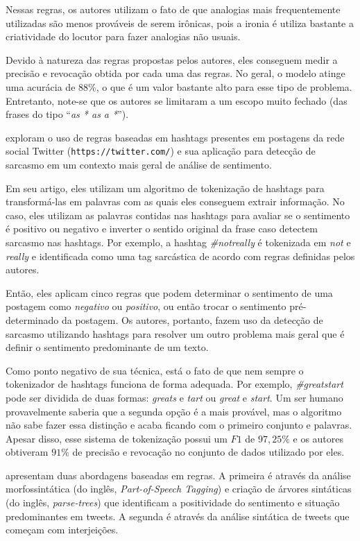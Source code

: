 Nessas regras, os autores utilizam o fato de que analogias mais frequentemente
utilizadas são menos prováveis de serem irônicas, pois a ironia é utiliza
bastante a criatividade do locutor para fazer analogias não usuais.

Devido à natureza das regras propostas pelos autores, eles conseguem medir a
precisão e revocação obtida por cada uma das regras. No geral, o modelo atinge
uma acurácia de $88\%$, o que é um valor bastante alto para esse tipo de
problema. Entretanto, note-se que os autores se limitaram a um escopo muito
fechado (das frases do tipo ``\textit{as * as a *}'').

\cite{maynard-greenwood:2014:cares} exploram o uso de regras baseadas em
hashtags presentes em postagens da rede social Twitter
(\texttt{https://twitter.com/}) e sua aplicação para detecção de sarcasmo em um
contexto mais geral de análise de sentimento.

Em seu artigo, eles utilizam um algoritmo de tokenização de hashtags para
transformá-las em palavras com as quais eles conseguem extrair informação. No
caso, eles utilizam as palavras contidas nas hashtags para avaliar se o
sentimento é positivo ou negativo e inverter o sentido original da frase caso
detectem sarcasmo nas hashtags. Por exemplo, a hashtag \textit{\#notreally} é
tokenizada em \textit{not} e \textit{really} e identificada como uma tag
sarcástica de acordo com regras definidas pelos autores.

Então, eles aplicam cinco regras que podem determinar o sentimento de uma
postagem como \textit{negativo} ou \textit{positivo}, ou então trocar o
sentimento pré-determinado da postagem. Os autores, portanto, fazem uso da
detecção de sarcasmo utilizando hashtags para resolver um outro problema mais
geral que é definir o sentimento predominante de um texto.

Como ponto negativo de sua técnica, está o fato de que nem sempre o tokenizador
de hashtags funciona de forma adequada. Por exemplo, \textit{\#greatstart} pode
ser dividida de duas formas: \textit{greats} e \textit{tart} ou \textit{great}
e \textit{start}. Um ser humano provavelmente saberia que a segunda opção é a
mais provável, mas o algoritmo não sabe fazer essa distinção e acaba ficando com
o primeiro conjunto e palavras. Apesar disso, esse sistema de tokenização possui
um $F1$ de $97,25\%$ e os autores obtiveram $91\%$ de precisão e revocação no
conjunto de dados utilizado por eles.

\cite{bharti-etal:2015:parsing-sarcasm} apresentam duas abordagens baseadas em
regras. A primeira é através da análise morfossintática (do inglês,
\textit{Part-of-Speech Tagging}) e criação de árvores sintáticas (do inglês,
\textit{parse-trees}) que identificam a positividade do sentimento e situação
predominantes em tweets. A segunda é através da análise sintática de tweets que
começam com interjeições.

